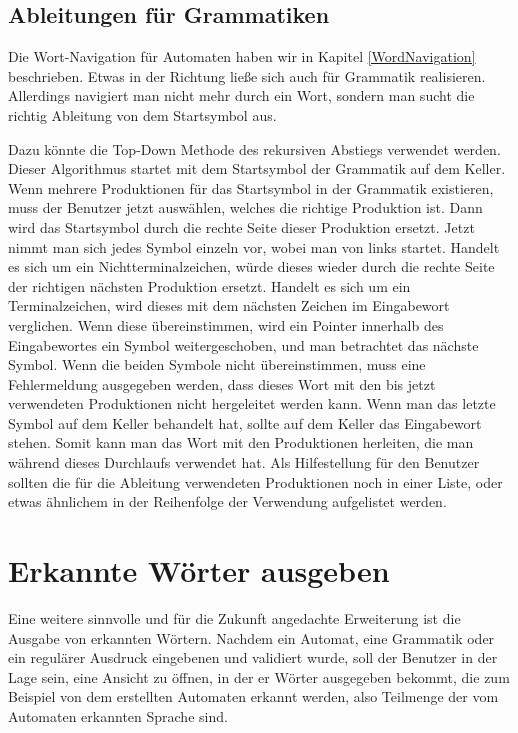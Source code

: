 \subsection{Ableitungen für Grammatiken}\label{PerspectiveGrammarWordNavigation}

Die Wort-Navigation für Automaten haben wir in Kapitel
\ref{WordNavigation} beschrieben. Etwas in der Richtung ließe sich
auch für Grammatik realisieren. Allerdings navigiert man nicht mehr
durch ein Wort, sondern man sucht die richtig Ableitung von dem
Startsymbol aus.\vspace{10pt}

Dazu könnte die Top-Down Methode des rekursiven Abstiegs verwendet werden. Dieser
Algorithmus startet mit dem Startsymbol der Grammatik auf dem Keller. Wenn
mehrere Produktionen für das Startsymbol in der Grammatik existieren, muss der
Benutzer jetzt auswählen, welches die richtige Produktion ist. Dann wird das
Startsymbol durch die rechte Seite dieser Produktion ersetzt. Jetzt nimmt man
sich jedes Symbol einzeln vor, wobei man von links startet. Handelt es sich um
ein Nichtterminalzeichen, würde dieses wieder durch die rechte Seite der
richtigen nächsten Produktion ersetzt. Handelt es sich um ein Terminalzeichen,
wird dieses mit dem nächsten Zeichen im Eingabewort verglichen. Wenn diese
übereinstimmen, wird ein Pointer innerhalb des Eingabewortes ein Symbol
weitergeschoben, und man betrachtet das nächste Symbol. Wenn die beiden Symbole
nicht übereinstimmen, muss eine Fehlermeldung ausgegeben werden, dass dieses Wort
mit den bis jetzt verwendeten Produktionen nicht hergeleitet werden kann. Wenn
man das letzte Symbol auf dem Keller behandelt hat, sollte auf dem Keller das
Eingabewort stehen. Somit kann man das Wort mit den Produktionen herleiten, die
man während dieses Durchlaufs verwendet hat. Als Hilfestellung für den Benutzer
sollten die für die Ableitung verwendeten Produktionen noch in einer Liste, oder
etwas ähnlichem in der Reihenfolge der Verwendung aufgelistet
werden.\vspace{10pt}

\section{Erkannte Wörter ausgeben}\label{PerspectiveDetectedWords}

Eine weitere sinnvolle und für die Zukunft angedachte Erweiterung ist die Ausgabe
von erkannten Wörtern. Nachdem ein Automat, eine Grammatik oder ein regulärer
Ausdruck eingebenen und validiert wurde, soll der Benutzer in der Lage sein, eine
Ansicht zu öffnen, in der er Wörter ausgegeben bekommt, die zum Beispiel von dem
erstellten Automaten erkannt werden, also Teilmenge der vom Automaten erkannten
Sprache sind.\vspace{10pt}

